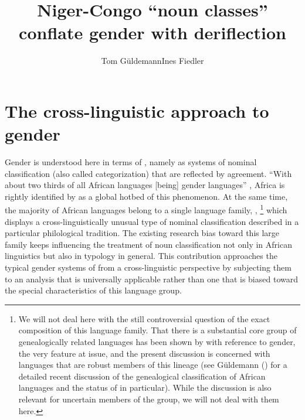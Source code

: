 \documentclass[output=collectionpaper]{langsci/langscibook}
\title{Niger-Congo ``noun classes'' conflate gender with deriflection}
\author{Tom Güldemann\affiliation{Humboldt University Berlin and Max Planck Institute for the Science of Human History}\lastand Ines Fiedler\affiliation{Humboldt University Berlin}}
\begin{document}
\section{The cross-linguistic approach to gender}
\label{sec:Gueld:1}

Gender is understood here in terms of \citet{Corbett1991}, namely as systems of nominal classification (also called categorization) that are reflected by agreement. ``With about two thirds of all African languages [being] gender languages'' \citep[190]{Heine1982}, Africa is rightly identified by \citet[131]{Nichols1992} as a global hotbed of this phenomenon. At the same time, the majority of African languages belong to a single language family, ,%
\footnote{We will not deal here with the still controversial question of the exact composition of this language family. That there is a substantial core group of genealogically related languages has been shown by \citet{Westermann1935} with reference to gender, the very feature at issue, and the present discussion is concerned with languages that are robust members of this lineage (see Güldemann (\citeyear{Gueldemann2018}) for a detailed recent discussion of the genealogical classification of African languages and the status of  in particular). While the discussion is also relevant for uncertain members of the group, we will not deal with them here.%
} %
which displays a cross-linguistically unusual type of nominal classification described in a particular philological tradition. The existing research bias toward this large family keeps influencing the treatment of noun classification not only in African linguistics but also in typology in general. This contribution approaches the typical gender systems of  from a cross-linguistic perspective by subjecting them to an analysis that is universally applicable rather than one that is biased toward the special characteristics of this language group.
\end{document}
